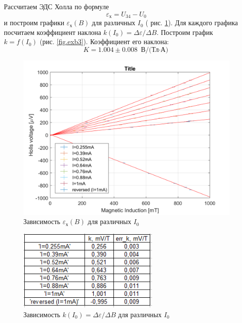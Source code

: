 \documentclass{article}
\begin{document}
   Рассчитаем ЭДС Холла по формуле 
   $$ \varepsilon_{\text{х}} = U_{34} - U_0 $$
   и построим графики  $\varepsilon_{\text{х}}(B)$ для различных $I_0$ ( рис. \ref{fig.exb1}). Для каждого графика посчитаем коэффициент наклона $k(I_0) = \Delta\varepsilon / \Delta B$. Построим график $k = f(I_0)$ (рис. \ref{fig.exb3}). Коэффициент его наклона:
   $$ K = 1.004 \pm 0.008 \text{ В/(Тл$\cdot$А)} $$
   
   \begin{figure}[ht]
   \centering
   \includegraphics[width=12cm]{plot1.png} 
   \caption{Зависимость $\varepsilon_{\text{х}}(B)$ для различных $I_0$} 
   \label{fig.exb1} 
   \end{figure}

	\newpage 
	
	\begin{figure}[ht]
   \centering
   \includegraphics[width=7cm]{table2.png} 
   \caption{Зависимость $k(I_0) = \Delta\varepsilon / \Delta B$ для различных $I_0$} 
   \label{fig.exb2} 
   \end{figure}
   
\end{document}
